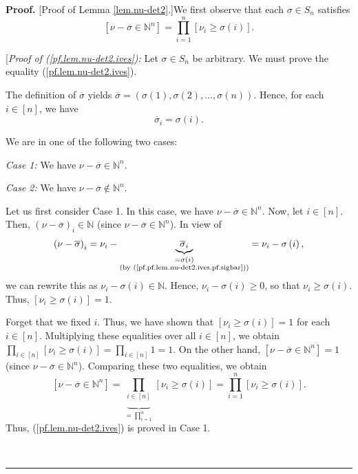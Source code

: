 \documentclass[numbers=enddot,12pt,final,onecolumn,notitlepage,english]{scrartcl}%
\theoremstyle{definition}
\newenvironment{proof}[1][Proof]{\noindent\textbf{#1.} }{\ \rule{0.5em}{0.5em}}
\let\prodnonlimits\prod
\renewcommand{\prod}{\prodnonlimits\limits}
\newenvironment{verlong}{}{}
\begin{document}
\begin{verlong}
\begin{proof}
[Proof of Lemma \ref{lem.nu-det2}.]We first observe that each $\sigma\in
S_{n}$ satisfies%
\begin{equation}
\left[  \nu-\overline{\sigma}\in\mathbb{N}^{n}\right]  =\prod_{i=1}^{n}\left[
\nu_{i}\geq\sigma\left(  i\right)  \right]  . \label{pf.lem.nu-det2.ives}%
\end{equation}


[\textit{Proof of (\ref{pf.lem.nu-det2.ives}):} Let $\sigma\in S_{n}$ be
arbitrary. We must prove the equality (\ref{pf.lem.nu-det2.ives}).

The definition of $\overline{\sigma}$ yields $\overline{\sigma}=\left(
\sigma\left(  1\right)  ,\sigma\left(  2\right)  ,\ldots,\sigma\left(
n\right)  \right)  $. Hence, for each $i\in\left[  n\right]  $, we have%
\begin{equation}
\overline{\sigma}_{i}=\sigma\left(  i\right)  .
\label{pf.pf.lem.nu-det2.ives.pf.sigbar}%
\end{equation}


We are in one of the following two cases:

\textit{Case 1:} We have $\nu-\overline{\sigma}\in\mathbb{N}^{n}$.

\textit{Case 2:} We have $\nu-\overline{\sigma}\notin\mathbb{N}^{n}$. \medskip

Let us first consider Case 1. In this case, we have $\nu-\overline{\sigma}%
\in\mathbb{N}^{n}$. Now, let $i\in\left[  n\right]  $. Then, $\left(
\nu-\overline{\sigma}\right)  _{i}\in\mathbb{N}$ (since $\nu-\overline{\sigma
}\in\mathbb{N}^{n}$). In view of
\[
\left(  \nu-\overline{\sigma}\right)  _{i}=\nu_{i}-\underbrace{\overline
{\sigma}_{i}}_{\substack{=\sigma\left(  i\right)  \\\text{(by
(\ref{pf.pf.lem.nu-det2.ives.pf.sigbar}))}}}=\nu_{i}-\sigma\left(  i\right)
,
\]
we can rewrite this as $\nu_{i}-\sigma\left(  i\right)  \in\mathbb{N}$. Hence,
$\nu_{i}-\sigma\left(  i\right)  \geq0$, so that $\nu_{i}\geq\sigma\left(
i\right)  $. Thus, $\left[  \nu_{i}\geq\sigma\left(  i\right)  \right]  =1$.

Forget that we fixed $i$. Thus, we have shown that $\left[  \nu_{i}\geq
\sigma\left(  i\right)  \right]  =1$ for each $i\in\left[  n\right]  $.
Multiplying these equalities over all $i\in\left[  n\right]  $, we obtain
$\prod_{i\in\left[  n\right]  }\left[  \nu_{i}\geq\sigma\left(  i\right)
\right]  =\prod_{i\in\left[  n\right]  }1=1$. On the other hand, $\left[
\nu-\overline{\sigma}\in\mathbb{N}^{n}\right]  =1$ (since $\nu-\overline
{\sigma}\in\mathbb{N}^{n}$). Comparing these two equalities, we obtain%
\[
\left[  \nu-\overline{\sigma}\in\mathbb{N}^{n}\right]  =\underbrace{\prod
_{i\in\left[  n\right]  }}_{=\prod_{i=1}^{n}}\left[  \nu_{i}\geq\sigma\left(
i\right)  \right]  =\prod_{i=1}^{n}\left[  \nu_{i}\geq\sigma\left(  i\right)
\right]  .
\]
Thus, (\ref{pf.lem.nu-det2.ives}) is proved in Case 1. \medskip


\end{proof}
\end{verlong}
\end{document}
